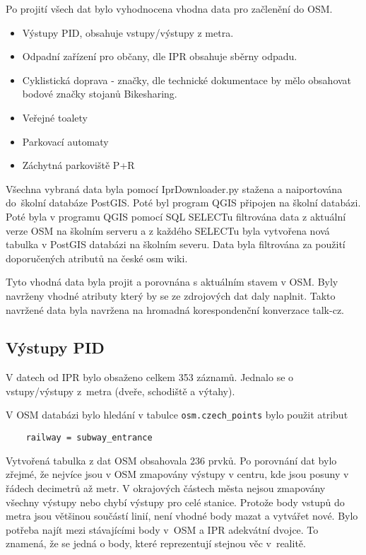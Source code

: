 Po projití všech dat bylo vyhodnocena vhodna data pro začlenění do OSM. 
\begin{itemize}
    \item   Výstupy PID, obsahuje vstupy/výstupy z metra.
    \item   Odpadní zařízení pro občany, dle IPR obsahuje sběrny odpadu. 
    \item   Cyklistická doprava - značky, dle technické dokumentace by mělo 
            obsahovat bodové značky stojanů Bikesharing.
    \item   Veřejné toalety
    \item   Parkovací automaty
    \item   Záchytná parkoviště P+R
\end{itemize}

Všechna vybraná data byla pomocí IprDownloader.py stažena a naiportována 
do~školní databáze PostGIS. Poté byl program QGIS připojen na školní databázi.
Poté byla v programu QGIS pomocí SQL SELECTu filtrována data z aktuální
verze OSM na školním serveru a z každého SELECTu byla vytvořena nová tabulka 
v PostGIS databázi na školním severu. Data byla filtrována za použití doporučených
atributů na české osm wiki. \cite{OSMfeatures}

Tyto vhodná data byla projit a porovnána s aktuálním stavem v OSM.
Byly navrženy vhodné atributy který by se ze zdrojových dat daly naplnit.
Takto navržené data byla navržena na hromadná korespondenční konverzace talk-cz.


\subsection{Výstupy PID}
\label{Výstupy PID}
V datech od IPR bylo obsaženo celkem 353 záznamů. Jednalo se o vstupy/výstupy
z~metra (dveře, schodiště a výtahy).

V OSM databázi bylo hledání v tabulce {\tt osm.czech\_points} bylo použit
atribut
\begin{verbatim}
    railway = subway_entrance
\end{verbatim}
Vytvořená tabulka z dat OSM obsahovala 236 prvků.
Po porovnání dat bylo zřejmé, že nejvíce jsou v OSM zmapovány
výstupy v centru, kde jsou posuny v řádech decimetrů až metr. V okrajových
částech města nejsou zmapovány všechny výstupy nebo chybí výstupy pro celé
stanice. Protože body vstupů do metra jsou většinou součástí linií,
není vhodné body mazat a vytvářet nové. Bylo potřeba najít mezi stávajícími body
v~OSM a IPR adekvátní dvojce. To znamená, že se jedná o body, které reprezentují 
stejnou věc v~realitě.

